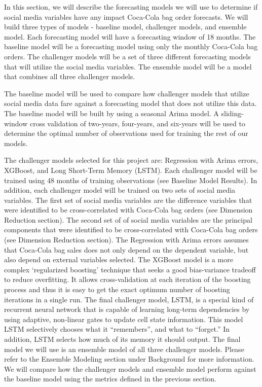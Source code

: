 \documentclass[12pt,oneside]{chicagocapstone}
\begin{document}
In this section, we will describe the forecasting models we will use to
determine if social media variables have any impact Coca-Cola bag order
forecasts. We will build three types of models - baseline model,
challenger models, and ensemble model. Each forecasting model will have
a forecasting window of 18 months. The baseline model will be a
forecasting model using only the monthly Coca-Cola bag orders. The
challenger models will be a set of three different forecasting models
that will utilize the social media variables. The ensemble model will be
a model that combines all three challenger models.

The baseline model will be used to compare how challenger models that
utilize social media data fare against a forecasting model that does not
utilize this data. The baseline model will be built by using a seasonal
Arima model. A sliding-window cross validation of two-years, four-years,
and six-years will be used to determine the optimal number of
observations used for training the rest of our models.

The challenger models selected for this project are: Regression with
Arima errors, XGBoost, and Long Short-Term Memory (LSTM). Each
challenger model will be trained using 48 months of training
observations (see Baseline Model Results). In addition, each challenger
model will be trained on two sets of social media variables. The first
set of social media variables are the difference variables that were
identified to be cross-correlated with Coca-Cola bag orders (see
Dimension Reduction section). The second set of of social media
variables are the principal components that were identified to be
cross-correlated with Coca-Cola bag orders (see Dimension Reduction
section). The Regression with Arima errors assumes that Coca-Cola bag
sales does not only depend on the dependent variable, but also depend on
external variables selected. The XGBoost model is a more complex
`regularized boosting' technique that seeks a good bias-variance
tradeoff to reduce overfitting. It allows cross-validation at each
iteration of the boosting process and thus it is easy to get the exact
optimum number of boosting iterations in a single run. The final
challenger model, LSTM, is a special kind of recurrent neural network
that is capable of learning long-term dependencies by using adaptive,
non-linear gates to update cell state information. This model LSTM
selectively chooses what it ``remembers'', and what to ``forget.'' In
addition, LSTM selects how much of its memory it should output. The
final model we will use is an ensemble model of all three challenger
models. Please refer to the Ensemble Modeling section under Background
for more information. We will compare how the challenger models and
ensemble model perform against the baseline model using the metrics
defined in the previous section.
\end{document}
